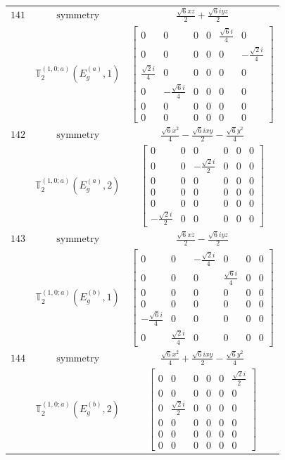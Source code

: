 \documentclass[fleqn,8pt,landscape]{jsarticle}
\begin{document}
\begin{longtable}{ccc}
$ 141 $ & $ \text{symmetry} $ & $ \frac{\sqrt{6} x z}{2} + \frac{\sqrt{6} i y z}{2} $ \\
$  $ & $ \mathbb{T}_{2}^{(1,0;a)}(E_{g}^{(a)},1) $ & $ \begin{bmatrix} 0 & 0 & 0 & 0 & \frac{\sqrt{6} i}{4} & 0 \\ 0 & 0 & 0 & 0 & 0 & - \frac{\sqrt{2} i}{4} \\ \frac{\sqrt{2} i}{4} & 0 & 0 & 0 & 0 & 0 \\ 0 & - \frac{\sqrt{6} i}{4} & 0 & 0 & 0 & 0 \\ 0 & 0 & 0 & 0 & 0 & 0 \\ 0 & 0 & 0 & 0 & 0 & 0 \end{bmatrix} $ \\ \hline
$ 142 $ & $ \text{symmetry} $ & $ \frac{\sqrt{6} x^{2}}{4} - \frac{\sqrt{6} i x y}{2} - \frac{\sqrt{6} y^{2}}{4} $ \\
$  $ & $ \mathbb{T}_{2}^{(1,0;a)}(E_{g}^{(a)},2) $ & $ \begin{bmatrix} 0 & 0 & 0 & 0 & 0 & 0 \\ 0 & 0 & - \frac{\sqrt{2} i}{2} & 0 & 0 & 0 \\ 0 & 0 & 0 & 0 & 0 & 0 \\ 0 & 0 & 0 & 0 & 0 & 0 \\ 0 & 0 & 0 & 0 & 0 & 0 \\ - \frac{\sqrt{2} i}{2} & 0 & 0 & 0 & 0 & 0 \end{bmatrix} $ \\ \hline
$ 143 $ & $ \text{symmetry} $ & $ \frac{\sqrt{6} x z}{2} - \frac{\sqrt{6} i y z}{2} $ \\
$  $ & $ \mathbb{T}_{2}^{(1,0;a)}(E_{g}^{(b)},1) $ & $ \begin{bmatrix} 0 & 0 & - \frac{\sqrt{2} i}{4} & 0 & 0 & 0 \\ 0 & 0 & 0 & \frac{\sqrt{6} i}{4} & 0 & 0 \\ 0 & 0 & 0 & 0 & 0 & 0 \\ 0 & 0 & 0 & 0 & 0 & 0 \\ - \frac{\sqrt{6} i}{4} & 0 & 0 & 0 & 0 & 0 \\ 0 & \frac{\sqrt{2} i}{4} & 0 & 0 & 0 & 0 \end{bmatrix} $ \\ \hline
$ 144 $ & $ \text{symmetry} $ & $ \frac{\sqrt{6} x^{2}}{4} + \frac{\sqrt{6} i x y}{2} - \frac{\sqrt{6} y^{2}}{4} $ \\
$  $ & $ \mathbb{T}_{2}^{(1,0;a)}(E_{g}^{(b)},2) $ & $ \begin{bmatrix} 0 & 0 & 0 & 0 & 0 & \frac{\sqrt{2} i}{2} \\ 0 & 0 & 0 & 0 & 0 & 0 \\ 0 & \frac{\sqrt{2} i}{2} & 0 & 0 & 0 & 0 \\ 0 & 0 & 0 & 0 & 0 & 0 \\ 0 & 0 & 0 & 0 & 0 & 0 \\ 0 & 0 & 0 & 0 & 0 & 0 \end{bmatrix} $ \\ \hline

\end{longtable}
\end{document}
